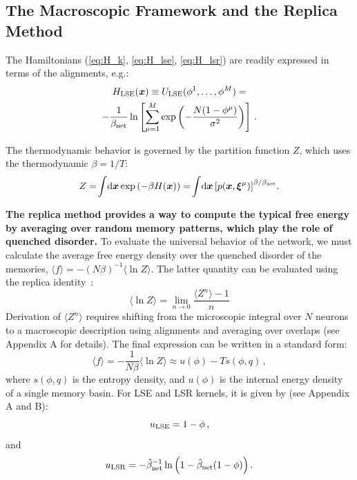 \documentclass{article}
\newcommand{\dd}{{\mathrm{d}}}
\theoremstyle{plain}
\theoremstyle{definition}
\theoremstyle{remark}
\begin{document}
\subsection{The Macroscopic Framework and the Replica Method}

The Hamiltonians (\ref{eq:H_k}, \ref{eq:H_lse}, \ref{eq:H_lsr}) are readily expressed in terms of the alignments, e.g.:
\begin{multline}
    H_{\rm LSE}(\bm{x}) \equiv U_{\rm LSE}(\phi^1, \dots, \phi^M) = \\ -\frac{1}{\beta_{\rm net}} \ln \left[ \sum_{\mu=1}^M \exp\left( -\frac{N(1 - \phi^\mu)}{\sigma^2} \right) \right]\,.
\end{multline}

The thermodynamic behavior is governed by the partition function $Z$, which uses the thermodynamic $\beta = 1/T$:
\begin{equation}
    Z = \!\int\!\dd \bm{x} \exp\left( -\beta H(\bm{x}) \right) = \!\int\! \dd \bm{x} \left[ p(\bm{x}, \bm{\xi}^\mu) \right]^{\beta/\beta_{\rm net}}\!.
    \label{eq:partition}
\end{equation}

\textbf{The replica method provides a way to compute the typical free energy by averaging over random memory patterns, which play the role of quenched disorder.}
To evaluate the universal behavior of the network, we must calculate the average free energy density over the quenched disorder of the memories, $\langle f \rangle = -(N\beta)^{-1} \langle \ln Z \rangle$. The latter quantity can be evaluated using the replica identity~\cite{sk75}:
\begin{equation}
    \langle \ln Z \rangle = \lim_{n \to 0} \frac{\langle Z^n \rangle - 1}{n}
    \label{eq:limit}
\end{equation}
Derivation of $\langle Z^n \rangle$ requires shifting from the microscopic integral over $N$ neurons to a macroscopic description using alignments and averaging over overlaps (see Appendix A for details). The final expression can be written in a standard form:
\begin{equation}
    \langle f \rangle = -\frac{1}{N\beta} \langle \ln Z \rangle 
    \approx  u(\phi) - T s(\phi, q)\,,
\end{equation}
where  $s(\phi, q)$ is the entropy density, and $u(\phi)$ is the internal energy density of a single memory basin. For LSE and LSR kernels, it is given by (see Appendix A and B):
\begin{equation}
    u_{\rm LSE} = 1-\phi\,,
\end{equation}
and 
\begin{equation}
    u_{\rm LSR} = -\hat\beta^{-1}_{\rm net} \ln \Big(1 - \hat\beta_{\rm net} (1-\phi) \Big)\,.
\end{equation}
\end{document}
